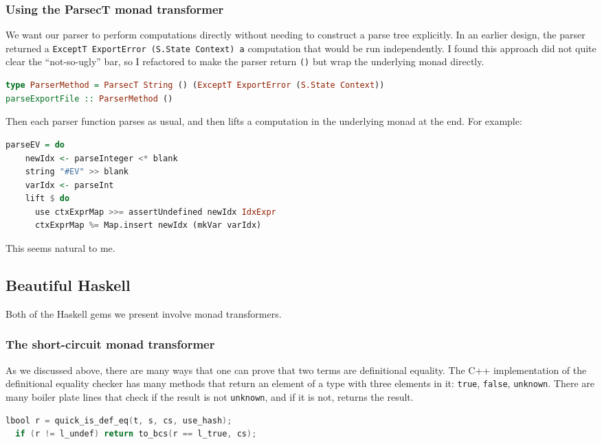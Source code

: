 \documentclass{article}
\begin{document}
\begin{spacing}{1.1}
\subsubsection{Using the ParsecT monad transformer}

We want our parser to perform computations directly without needing to construct a parse tree explicitly. In an earlier design, the parser returned a \lstinline{ExceptT ExportError (S.State Context) a} computation that would be run independently. I found this approach did not quite clear the ``not-so-ugly'' bar, so I refactored to make the parser return \lstinline{()} but wrap the underlying monad directly.
\begin{lstlisting}[language=Haskell]
type ParserMethod = ParsecT String () (ExceptT ExportError (S.State Context))
parseExportFile :: ParserMethod ()
\end{lstlisting}

Then each parser function parses as usual, and then lifts a computation in the underlying monad at the end. For example:
\begin{lstlisting}[language=Haskell]
  parseEV = do
    newIdx <- parseInteger <* blank
    string "#EV" >> blank
    varIdx <- parseInt
    lift $ do
      use ctxExprMap >>= assertUndefined newIdx IdxExpr
      ctxExprMap %= Map.insert newIdx (mkVar varIdx)
\end{lstlisting}

This seems natural to me.

\subsection{Beautiful Haskell}

Both of the Haskell gems we present involve monad transformers.

\subsubsection{The short-circuit monad transformer}

As we discussed above, there are many ways that one can prove that two terms are definitional equality. The C++ implementation of the definitional equality checker has many methods that return an element of a type with three elements in it: \lstinline{true}, \lstinline{false}, \lstinline{unknown}. There are many boiler plate lines that check if the result is not \lstinline{unknown}, and if it is not, returns the result.

\begin{lstlisting}[language=C++]
  lbool r = quick_is_def_eq(t, s, cs, use_hash);
  if (r != l_undef) return to_bcs(r == l_true, cs);


\end{lstlisting}
\end{spacing}
\end{document}
